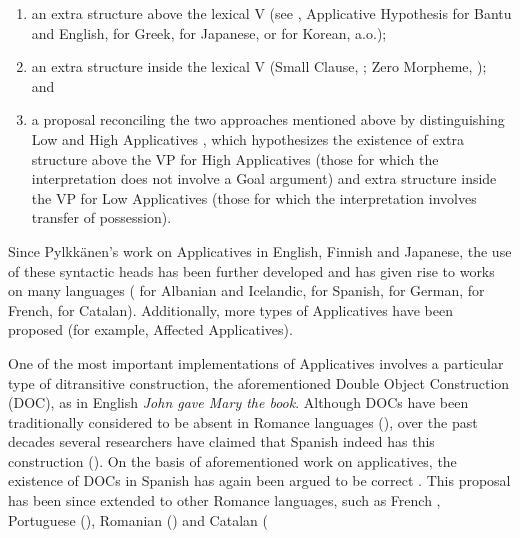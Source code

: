 \documentclass[output=paper,modfonts,nonflat,colorlinks,citecolor=brown]{langsci/langscibook}
\begin{document}
\begin{enumerate}
\item
an extra structure above the lexical V (see \citealt{Baker1988,Baker1997},  Applicative Hypothesis for Bantu and English, \citet{Anagnostopoulou2003} for Greek, \citet{MiyagawaTsujioka2004} for Japanese, or \citet{MiyagawaJung2004} for Korean, a.o.);

\item
 an extra structure inside the lexical V (Small Clause, \citealt{Kayne1984}; Zero Morpheme, \citealt{Pesetsky1995}); and

\item
a proposal reconciling the two approaches mentioned above by distinguishing Low and High Applicatives \citep{Pylkkänen2002}, which hypothesizes the existence of extra structure above the VP for High Applicatives (those for which the interpretation does not involve a Goal argument) and extra structure inside the VP for Low Applicatives (those for which the interpretation involves transfer of possession).

\end{enumerate}

{Since Pylkkänen's work on Applicatives in English, Finnish and Japanese, the use of these syntactic heads has been further developed and has given rise to works on many languages (\citealt{McGinnis2001} for Albanian and Icelandic, \citealt{Cuervo2003} for Spanish, \citealt{McIntyre2006} for German, \citealt{Fournier2010} for French, \citealt{Pineda2013, Pineda2016, PinedaPress} for Catalan). Additionally, more types of Applicatives have been proposed (for example,  Affected Applicatives).~}



{One of the most important implementations of Applicatives involves a particular type of ditransitive construction, the aforementioned Double Object Construction (DOC), as in English} {\textit{John gave Mary the book}}{. Although DOCs have been traditionally considered to be absent in Romance languages (\citealt{Kayne1984,HolmbergPlatzack1995}), over the past decades several researchers have claimed that Spanish indeed has this construction (\citealt{Masullo1992thesis,Demonte1995,Romero1997,Bleam2003}). On the basis of  aforementioned work on applicatives, the existence of DOCs in Spanish has again been argued to be correct \citep{Cuervo2003}. This proposal has been since extended to other Romance languages, such as French \citep{Fournier2010}, Portuguese (\citealt{TorresMoraisSalles2010}), Romanian (\citealt{DiaconescuRivero2007}) and Catalan (\citealt{Pineda2013, Pineda2016, PinedaPress}}
\end{document}
